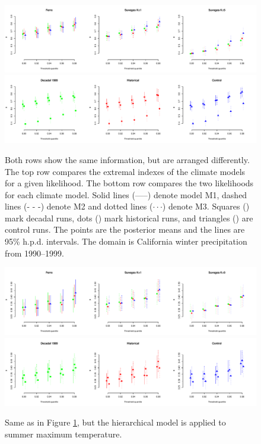\begin{figure}
\begin{center}
\includegraphics[scale=0.46]{figs/winter_like.pdf}
\includegraphics[scale=0.46]{figs/winter_source.pdf}
\end{center}
\caption{Both rows show the same information, but are arranged differently. The top row compares the extremal indexes of the climate models for a given likelihood. The bottom row compares the two likelihoods for each climate model. Solid lines (-----) denote model M1, dashed lines (- - -) denote M2 and dotted lines ($\cdot\cdot\cdot$) denote M3. Squares (\symsquare) mark decadal runs, dots (\symcircle) mark historical runs, and triangles (\symtriangle) are control runs. The points are the posterior means and the lines are 95\% h.p.d. intervals. The domain is California winter precipitation from 1990--1999.}
\label{figwinter}
\end{figure}

\begin{figure}
\begin{center}
\includegraphics[scale=0.46]{figs/summer_like.pdf}
\includegraphics[scale=0.46]{figs/summer_source.pdf}
\end{center}
\caption{Same as in Figure \ref{figwinter}, but the hierarchical model is applied to summer maximum temperature.}
\label{figsummer}
\end{figure}

